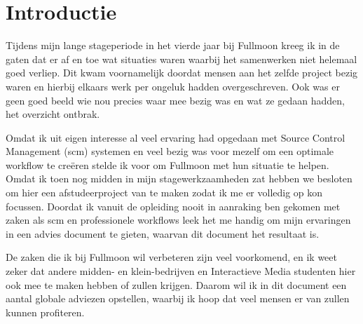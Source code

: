 \setcounter{chapter}{0}
\chapter{Introductie}
  
Tijdens mijn lange stageperiode in het vierde jaar bij Fullmoon kreeg ik in de gaten dat er af en toe wat situaties waren waarbij het samenwerken niet helemaal goed verliep. Dit kwam voornamelijk doordat mensen aan het zelfde project bezig waren en hierbij elkaars werk per ongeluk hadden overgeschreven. Ook was er geen goed beeld wie nou precies waar mee bezig was en wat ze gedaan hadden, het overzicht ontbrak.
  
Omdat ik uit eigen interesse al veel ervaring had opgedaan met Source Control Management ({\sc scm}) systemen en veel bezig was voor mezelf om een optimale workflow te creëren stelde ik voor om Fullmoon met hun situatie te helpen. Omdat ik toen nog midden in mijn stagewerkzaamheden zat hebben we besloten om hier een afstudeerproject van te maken zodat ik me er volledig op kon focussen. Doordat ik vanuit de opleiding nooit in aanraking ben gekomen met zaken als {\sc scm} en professionele workflows leek het me handig om mijn ervaringen in een advies document te gieten, waarvan dit document het resultaat is.
  
De zaken die ik bij Fullmoon wil verbeteren zijn veel voorkomend, en ik weet zeker dat andere midden- en klein-bedrijven en Interactieve Media studenten hier ook mee te maken hebben of zullen krijgen. Daarom wil ik in dit document een aantal globale adviezen opstellen, waarbij ik hoop dat veel mensen er van zullen kunnen profiteren.
  